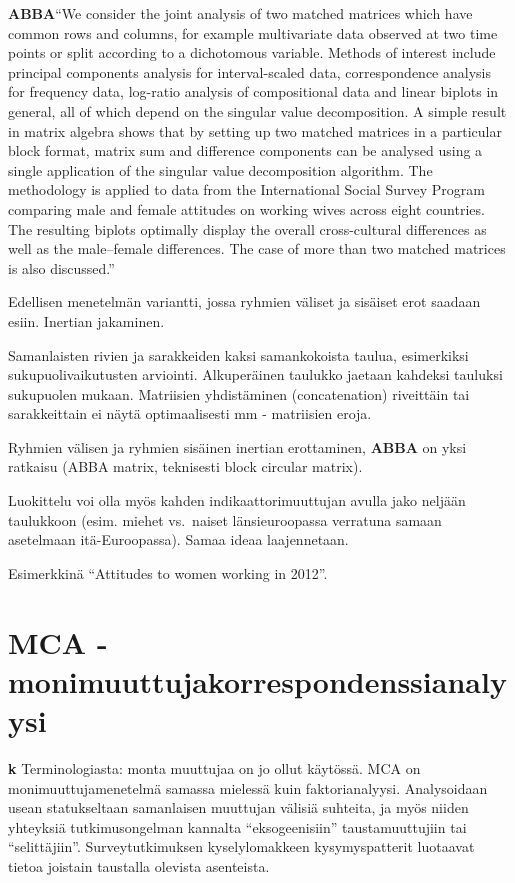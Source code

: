 \documentclass[
  finnish,
]{book}
\begin{document}
\textbf{ABBA}``We consider the joint analysis of two matched matrices which have common
rows and columns, for example multivariate data observed at two time points or split
according to a dichotomous variable. Methods of interest include principal components
analysis for interval-scaled data, correspondence analysis for frequency data, log-ratio
analysis of compositional data and linear biplots in general, all of which depend on the
singular value decomposition. A simple result in matrix algebra shows that by setting up
two matched matrices in a particular block format, matrix sum and difference components
can be analysed using a single application of the singular value decomposition algorithm.
The methodology is applied to data from the International Social Survey Program
comparing male and female attitudes on working wives across eight countries. The resulting
biplots optimally display the overall cross-cultural differences as well as the male--female
differences. The case of more than two matched matrices is also discussed.''

Edellisen menetelmän variantti, jossa ryhmien väliset ja sisäiset erot saadaan
esiin. Inertian jakaminen.

Samanlaisten rivien ja sarakkeiden kaksi samankokoista taulua, esimerkiksi
sukupuolivaikutusten arviointi. Alkuperäinen taulukko jaetaan kahdeksi tauluksi
sukupuolen mukaan. Matriisien yhdistäminen (concatenation) riveittäin tai
sarakkeittain ei näytä optimaalisesti mm - matriisien eroja.

Ryhmien välisen ja ryhmien sisäinen inertian erottaminen, \textbf{ABBA}
on yksi ratkaisu (ABBA matrix, teknisesti block circular matrix).

Luokittelu voi olla myös kahden indikaattorimuuttujan avulla jako neljään
taulukkoon (esim. miehet vs.~naiset länsieuroopassa verratuna samaan asetelmaan
itä-Euroopassa). Samaa ideaa laajennetaan.

Esimerkkinä ``Attitudes to women working in 2012''.

\hypertarget{mca---monimuuttujakorrespondenssianalyysi}{%
\section{MCA - monimuuttujakorrespondenssianalyysi}\label{mca---monimuuttujakorrespondenssianalyysi}}

\textbf{k} Terminologiasta: monta muuttujaa on jo ollut käytössä. MCA on monimuuttujamenetelmä
samassa mielessä kuin faktorianalyysi. Analysoidaan usean statukseltaan samanlaisen
muuttujan välisiä suhteita, ja myös niiden yhteyksiä tutkimusongelman kannalta
``eksogeenisiin'' taustamuuttujiin tai ``selittäjiin''. Surveytutkimuksen kyselylomakkeen
kysymyspatterit luotaavat tietoa joistain taustalla olevista asenteista.
\end{document}
